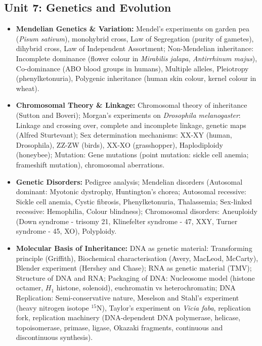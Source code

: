 \documentclass[11pt,a4paper]{article}
\begin{document}
\subsection{Unit 7: Genetics and Evolution}
\begin{itemize}
  \item \textbf{Mendelian Genetics \& Variation:} Mendel's experiments on garden pea (\textit{Pisum sativum}), monohybrid cross, Law of Segregation (purity of gametes), dihybrid cross, Law of Independent Assortment; Non-Mendelian inheritance: Incomplete dominance (flower colour in \textit{Mirabilis jalapa}, \textit{Antirrhinum majus}), Co-dominance (ABO blood groups in humans), Multiple alleles, Pleiotropy (phenylketonuria), Polygenic inheritance (human skin colour, kernel colour in wheat).
  \item \textbf{Chromosomal Theory \& Linkage:} Chromosomal theory of inheritance (Sutton and Boveri); Morgan's experiments on \textit{Drosophila melanogaster}: Linkage and crossing over, complete and incomplete linkage, genetic maps (Alfred Sturtevant); Sex determination mechanisms: XX-XY (human, Drosophila), ZZ-ZW (birds), XX-XO (grasshopper), Haplodiploidy (honeybee); Mutation: Gene mutations (point mutation: sickle cell anemia; frameshift mutation), chromosomal aberrations.
  \item \textbf{Genetic Disorders:} Pedigree analysis; Mendelian disorders (Autosomal dominant: Myotonic dystrophy, Huntington's chorea; Autosomal recessive: Sickle cell anemia, Cystic fibrosis, Phenylketonuria, Thalassemia; Sex-linked recessive: Hemophilia, Colour blindness); Chromosomal disorders: Aneuploidy (Down syndrome - trisomy 21, Klinefelter syndrome - 47, XXY, Turner syndrome - 45, XO), Polyploidy.
  \item \textbf{Molecular Basis of Inheritance:} DNA as genetic material: Transforming principle (Griffith), Biochemical characterisation (Avery, MacLeod, McCarty), Blender experiment (Hershey and Chase); RNA as genetic material (TMV); Structure of DNA and RNA; Packaging of DNA: Nucleosome model (histone octamer, $H_1$ histone, solenoid), euchromatin vs heterochromatin; DNA Replication: Semi-conservative nature, Meselson and Stahl's experiment (heavy nitrogen isotope $^{15}\text{N}$), Taylor's experiment on \textit{Vicia faba}, replication fork, replication machinery (DNA-dependent DNA polymerase, helicase, topoisomerase, primase, ligase, Okazaki fragments, continuous and discontinuous synthesis).

\end{itemize}
\end{document}
